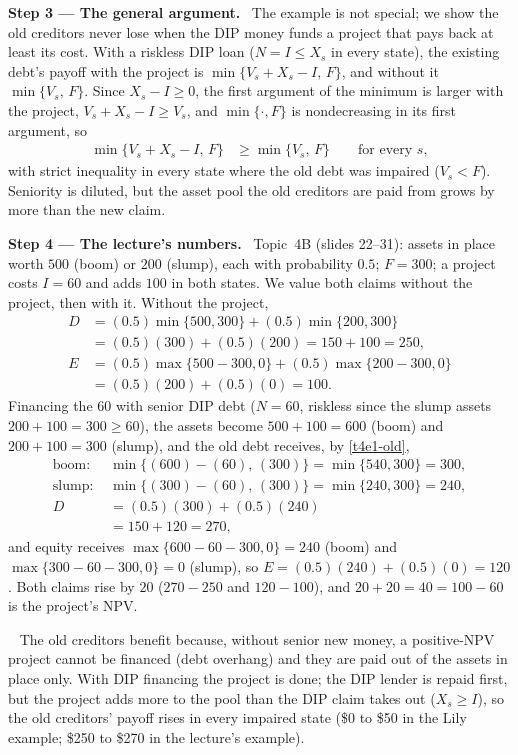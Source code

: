 \documentclass[11pt,a4paper]{article}
\newcommand{\step}[2]{\par\medskip\noindent\textbf{Step #1 --- #2.}~}
\newcommand{\answer}[1]{\par\smallskip\noindent\fbox{\textbf{Answer #1.}}~}
\begin{document}
\step{3}{The general argument} The example is not special; we show the old creditors never lose
when the DIP money funds a project that pays back at least its cost. With a riskless DIP loan ($N=I\le X_s$ in every state), the
existing debt's payoff with the project is $\min\{V_s+X_s-I,\,F\}$, and without it
$\min\{V_s,\,F\}$. Since $X_s-I\ge 0$, the first argument of the minimum is larger with the
project, $V_s+X_s-I\ge V_s$, and $\min\{\cdot,F\}$ is nondecreasing in its first argument, so
\begin{align}
  \min\{V_s+X_s-I,\,F\} &\ge \min\{V_s,\,F\} \qquad\text{for every } s, \label{t4e1-dom}
\end{align}
with strict inequality in every state where the old debt was impaired ($V_s<F$). Seniority is
diluted, but the asset pool the old creditors are paid from grows by more than the new claim.

\step{4}{The lecture's numbers} Topic~4B (slides 22--31): assets in place worth $500$ (boom)
or $200$ (slump), each with probability $0.5$; $F=300$; a project costs $I=60$ and adds $100$
in both states. We value both claims without the project, then with it. Without the project,
\begin{align}
  D &= (0.5)\min\{500,300\}+(0.5)\min\{200,300\} \nonumber\\
    &= (0.5)(300)+(0.5)(200) = 150+100 = 250, \nonumber\\
  E &= (0.5)\max\{500-300,0\}+(0.5)\max\{200-300,0\} \nonumber\\
    &= (0.5)(200)+(0.5)(0) = 100. \nonumber
\end{align}
Financing the $60$ with senior DIP debt ($N=60$, riskless since the slump assets $200+100=300\ge 60$),
the assets become $500+100=600$ (boom) and $200+100=300$ (slump), and the old debt
receives, by \eqref{t4e1-old},
\begin{align}
  \text{boom: } & \min\{(600)-(60),\,(300)\} = \min\{540,300\} = 300, \nonumber\\
  \text{slump: } & \min\{(300)-(60),\,(300)\} = \min\{240,300\} = 240, \nonumber\\
  D &= (0.5)(300)+(0.5)(240) \label{t4e1-D}\\
    &= 150+120 = 270, \nonumber
\end{align}
and equity receives $\max\{600-60-300,0\}=240$ (boom) and $\max\{300-60-300,0\}=0$ (slump), so
$E=(0.5)(240)+(0.5)(0)=120$. Both claims rise by $20$ ($270-250$ and $120-100$), and
$20+20=40=100-60$ is the project's NPV.

\answer{(16.14)} The old creditors benefit because, without senior new money, a positive-NPV project
cannot be financed (debt overhang) and they are paid out of the assets in place only. With DIP
financing the project is done; the DIP lender is repaid first, but the project adds more to the
pool than the DIP claim takes out ($X_s\ge I$), so the old creditors' payoff rises in every
impaired state (\$0 to \$50 in the Lily example; \$250 to \$270 in the lecture's example).
\end{document}
